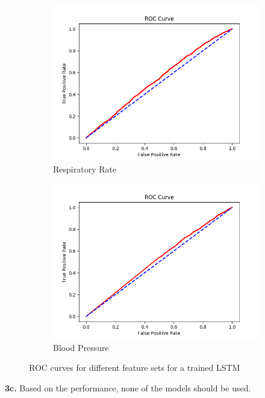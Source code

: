 \documentclass[]{article}
\begin{document}
\begin{figure}[t]
\begin{subfigure}[b]{0.475\textwidth}
		\centering 
		\includegraphics[width=\textwidth]{ROC_part3b_RESPIRATORY_RATE.png}
		\caption[]%
		{{\small Respiratory Rate}}    
		\label{fig:3bresp}
	\end{subfigure}
	\quad
	\begin{subfigure}[b]{0.475\textwidth}   
		\centering 
		\includegraphics[width=\textwidth]{ROC_part3b_BLOOD_PRESSURE.png}
		\caption[]%
		{{\small Blood Pressure}}    
		\label{fig:3bbp}
	\end{subfigure}
	\caption[]
	{\small ROC curves for different feature sets for a trained LSTM} 
	\label{fig:3b}
\end{figure}


\textbf{3c.} Based on the performance, none of the models should be used. 
\end{document}
